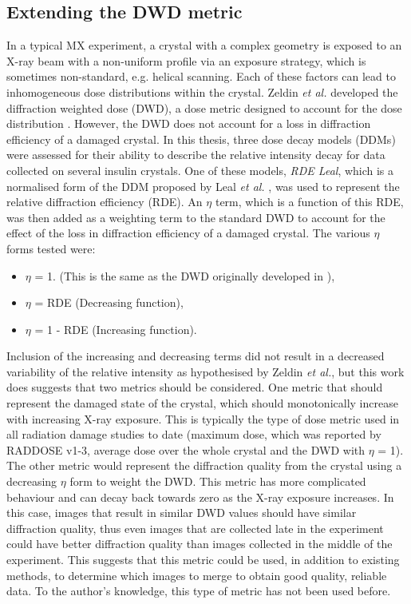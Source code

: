 \subsection{Extending the DWD metric}
\label{sub:Extending the DWD metric}
In a typical MX experiment, a crystal with a complex geometry is exposed to an X-ray beam with a non-uniform profile via an exposure strategy, which is sometimes non-standard, e.g. helical scanning.
Each of these factors can lead to inhomogeneous dose distributions within the crystal.
Zeldin \textit{et al.} developed the diffraction weighted dose (DWD), a dose metric designed to account for the dose distribution \cite{zeldin2013dwd}.
However, the DWD does not account for a loss in diffraction efficiency of a damaged crystal.
In this thesis, three dose decay models  (DDMs) were assessed for their ability to describe the relative intensity decay for data collected on several insulin crystals.
One of these models, \textit{RDE Leal}, which is a normalised form of the DDM proposed by Leal \textit{et al.} \cite{leal2012}, was used to represent the relative diffraction efficiency (RDE).
An $\eta$ term, which is a function of this RDE, was then added as a weighting term to the standard DWD to account for the effect of the loss in diffraction efficiency of a damaged crystal.
The various $\eta$ forms tested were:
\begin{itemize}
    \item $\eta$ = 1. (This is the same as the DWD originally developed in \cite{zeldin2013dwd}),
    \item $\eta$ = RDE (Decreasing function),
    \item $\eta$ = 1 - RDE (Increasing function).
\end{itemize}
Inclusion of the increasing and decreasing terms did not result in a decreased variability of the relative intensity as hypothesised by Zeldin \textit{et al.}, but this work does suggests that two metrics should be considered.
One metric that should represent the damaged state of the crystal, which should monotonically increase with increasing X-ray exposure.
This is typically the type of dose metric used in all radiation damage studies to date (maximum dose, which was reported by RADDOSE v1-3, average dose over the whole crystal and the DWD with $\eta$ = 1).
The other metric would represent the diffraction quality from the crystal using a decreasing $\eta$ form to weight the DWD.
This metric has more complicated behaviour and can decay back towards zero as the X-ray exposure increases.
In this case, images that result in similar DWD values should have similar diffraction quality, thus even images that are collected late in the experiment could have better diffraction quality than images collected in the middle of the experiment.
This suggests that this metric could be used, in addition to existing methods, to determine which images to merge to obtain good quality, reliable data.
To the author's knowledge, this type of metric has not been used before.

